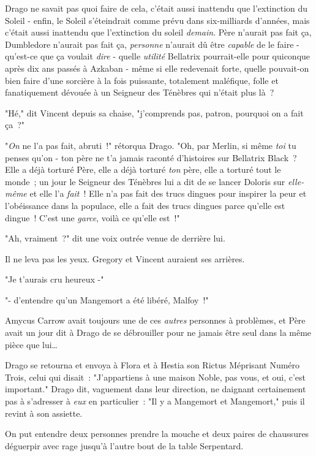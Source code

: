 Drago ne savait pas quoi faire de cela, c'était aussi inattendu que l'extinction du Soleil - enfin, le Soleil s'éteindrait comme prévu dans six-milliards d'années, mais c'était aussi inattendu que l'extinction du soleil \emph{demain}. Père n'aurait pas fait ça, Dumbledore n'aurait pas fait ça, \emph{personne} n'aurait dû être \emph{capable} de le faire - qu'est-ce que ça voulait \emph{dire} - quelle \emph{utilité} Bellatrix pourrait-elle pour quiconque après dix ans passés à Azkaban - même si elle redevenait forte, quelle pouvait-on bien faire d'une sorcière à la fois puissante, totalement maléfique, folle et fanatiquement dévouée à un Seigneur des Ténèbres qui n'était plus là~?

"Hé," dit Vincent depuis sa chaise, "j'comprends pas, patron, pourquoi on a fait ça~?"

"\emph{On} ne l'a pas fait, abruti~!" rétorqua Drago. "Oh, par Merlin, si même \emph{toi} tu penses qu'on - ton père ne t'a jamais raconté d'histoires sur Bellatrix Black~? Elle a déjà torturé Père, elle a déjà torturé \emph{ton} père, elle a torturé tout le monde~; un jour le Seigneur des Ténèbres lui a dit de se lancer Doloris sur \emph{elle-même} et elle l'a \emph{fait}~! Elle n'a pas fait des trucs dingues pour inspirer la peur et l'obéissance dans la populace, elle a fait des trucs dingues parce qu'elle est dingue~! C'est une \emph{garce}, voilà ce qu'elle est~!"

"Ah, vraiment~?" dit une voix outrée venue de derrière lui.

Il ne leva pas les yeux. Gregory et Vincent auraient ses arrières.

"Je t'aurais cru heureux -"

"- d'entendre qu'un Mangemort a été libéré, Malfoy~!"

Amycus Carrow avait toujours une de ces \emph{autres} personnes à problèmes, et Père avait un jour dit à Drago de se débrouiller pour ne jamais être seul dans la même pièce que lui…

Drago se retourna et envoya à Flora et à Hestia son Rictus Méprisant Numéro Trois, celui qui disait~: "J'appartiens à une maison Noble, pas vous, et oui, c'est important." Drago dit, vaguement dans leur direction, ne daignant certainement pas à s'adresser à \emph{eux} en particulier~: "Il y a Mangemort et Mangemort," puis il revint à son assiette.

On put entendre deux personnes prendre la mouche et deux paires de chaussures déguerpir avec rage jusqu'à l'autre bout de la table Serpentard.

